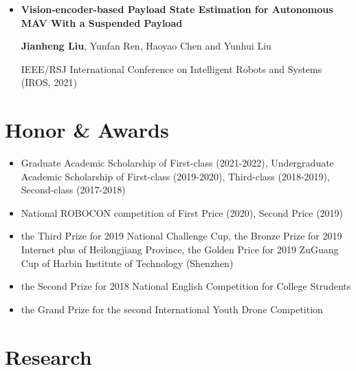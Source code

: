 \documentclass[11pt,a4paper,sans]{moderncv}        %
\begin{document}
{\begin{itemize}
{\small{RA-L and IROS, 2022}
}

\vspace{3pt}

\item{\textbf{Vision-encoder-based Payload State Estimation for Autonomous MAV With a Suspended Payload}

\small{\textbf{Jianheng Liu}, Yunfan Ren, Haoyao Chen and Yunhui Liu}

\small{IEEE/RSJ International Conference on Intelligent Robots and Systems (IROS, 2021) }
}


\end{itemize}

\section{Honor \& Awards}

\vspace{6pt}

\begin{itemize}

\item{Graduate Academic Scholarship of First-class (2021-2022), Undergraduate Academic Scholarship of First-class (2019-2020), Third-class (2018-2019), Second-class (2017-2018)}

\item{National ROBOCON competition of First Price (2020), Second Price (2019)}

\item{the Third Prize for 2019 National Challenge Cup, the Bronze Prize for 2019 Internet plus of Heilongjiang Province, the Golden Price for 2019  ZuGuang Cup of Harbin Institute of Technology (Shenzhen)}

\item{the Second Prize for 2018 National English Competition for College Strudents}

\item{the Grand Prize for the second International Youth Drone Competition}

\end{itemize}


\section{Research}

\vspace{6pt}

}
\end{document}
